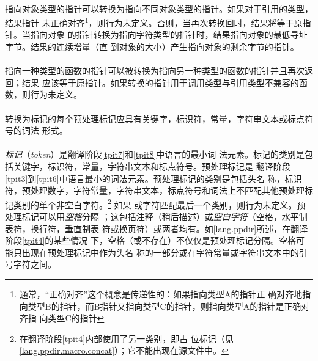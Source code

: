 \paragraph{}
指向对象类型的指针可以转换为指向不同对象类型的指针。如果对于引用的类型，结果指针
未正确对齐\footnote{通常，``正确对齐''这个概念是传递性的：如果指向类型A的指针正
确对齐地指向类型B的指针，而B指针又指向类型C的指针，则指向类型A的指针是正确对齐指
向类型C的指针}，则行为未定义。否则，当再次转换回时，结果将等于原指针。当指向对象
的指针转换为指向字符类型的指针时，结果指向对象的最低寻址字节。结果的连续增量（直
到对象的大小）产生指向对象的剩余字节的指针。

\paragraph{}
指向一种类型的函数的指针可以被转换为指向另一种类型的函数的指针并且再次返回；结果
应该等于原指针。如果转换的指针用于调用类型与引用类型不兼容的函数，则行为未定义。


\syntax
\paragraph{}

\constraint
\paragraph{}
转换为标记的每个预处理标记应具有关键字，标识符，常量，字符串文本或标点符号的词法
形式。

\semantic
\paragraph{}
\textit{标记}（\textit{token}）是翻译阶段\ref{tpit7}和\ref{tpit8}中语言的最小词
法元素。标记的类别是包括关键字，标识符，常量，字符串文本和标点符号。预处理标记是
翻译阶段\ref{tpit3}到\ref{tpit6}中语言最小的词法元素。预处理标记的类别是包括头名
称，标识符，预处理数字，字符常量，字符串文本，标点符号和词法上不匹配其他预处理标
记类别的单个非空白字符。\footnote{在翻译阶段\ref{tpit4}内部使用了另一类别，即占
位标记（见\ref{lang.ppdir.macro.concat}）；它不能出现在源文件中。} 如果\tm{\sq}
或\tm{\dq}字符匹配最后一个类别，则行为未定义。预处理标记可以用\textit{空格}分隔
；这包括注释（稍后描述）或\textit{空白字符}（空格，水平制表符，换行符，垂直制表
符或换页符）或两者均有。如\ref{lang.ppdir}所述，在翻译阶段\ref{tpit4}的某些情况
下，空格（或不存在）不仅仅是预处理标记分隔。空格可能只出现在预处理标记中作为头名
称的一部分或在字符常量或字符串文本中的引号字符之间。

